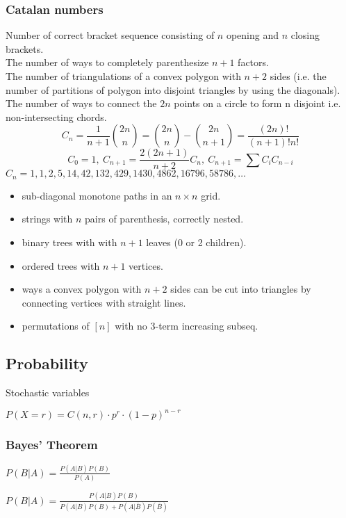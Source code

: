 \documentclass[
	a4paper,
	landscape,
	10pt,
]{article}
\begin{document}
\begin{multicols}{3}
	\subsubsection*{Catalan numbers}
		Number of correct bracket sequence consisting of $n$ opening and $n$
		closing brackets. \\
		The number of ways to completely parenthesize $n+1$ factors. \\
		The number of triangulations of a convex polygon with $n+2$
		sides (i.e. the number of partitions of polygon into disjoint triangles by using the diagonals). \\
		The number of ways to connect the $2n$
		points on a circle to form n disjoint i.e. non-intersecting chords.
		\[ C_n=\frac{1}{n+1}\binom{2n}{n}= \binom{2n}{n}-\binom{2n}{n+1} = \frac{(2n)!}{(n+1)!n!} \]
		\[ C_0=1,\ C_{n+1} = \frac{2(2n+1)}{n+2}C_n,\ C_{n+1}=\sum C_iC_{n-i} \]
		${C_n = 1, 1, 2, 5, 14, 42, 132, 429, 1430, 4862, 16796, 58786, \dots}$
		\begin{itemize}[noitemsep]
			\item sub-diagonal monotone paths in an $n\times n$ grid.
			\item strings with $n$ pairs of parenthesis, correctly nested.
			\item binary trees with with $n+1$ leaves (0 or 2 children).
			\item ordered trees with $n+1$ vertices.
			\item ways a convex polygon with $n+2$ sides can be cut into triangles by connecting vertices with straight lines.
			\item permutations of $[n]$ with no 3-term increasing subseq.
		\end{itemize}

    \subsection{Probability} Stochastic variables

        $P(X=r) = C(n,r) \cdot p^r \cdot (1-p)^{n-r}$

        \subsubsection*{Bayes' Theorem}

        $P(B|A) = \frac{P(A|B) P(B)}{P(A)}$
        
        $P(B|A) = \frac{P(A|B)P(B)}{P(A|B)P(B) + P(A|\bar{B})P(\bar{B})}$
        

\end{multicols}
\end{document}
